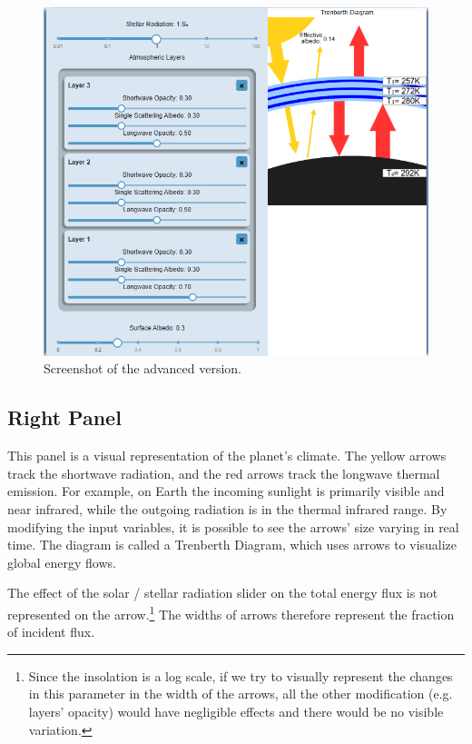 \documentclass[a4paper,12pt]{article}
\begin{document}
\begin{figure}[H]
    \centering
    \includegraphics[width=\textwidth]{Pro.PNG}
    \caption{Screenshot of the advanced version.}
    \label{fig:pro}
\end{figure}


\subsection*{Right Panel}

This panel is a visual representation of the planet's climate. The yellow arrows track the shortwave radiation, and the red arrows track the longwave thermal emission. For example, on Earth the incoming sunlight is primarily visible and near infrared, while the outgoing radiation is in the thermal infrared range. By modifying the input variables, it is possible to see the arrows' size varying in real time. The diagram is called a Trenberth Diagram, which uses arrows to visualize global energy flows.

The effect of the solar / stellar radiation slider on the total energy flux is not represented on the arrow.\footnote{Since the insolation is a log scale, if we try to visually represent the changes in this parameter in the width of the arrows, all the other modification (e.g. layers' opacity) would have negligible effects and there would be no visible variation.} The widths of arrows therefore represent the fraction of incident flux.
\end{document}
